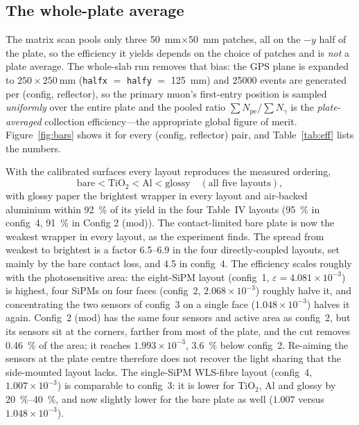 \documentclass[11pt,a4paper]{article}
\newcommand{\pe}{\ensuremath{N_{\mathrm{pe}}}}
\newcommand{\ngam}{\ensuremath{N_{\gamma}}}
\newcommand{\eff}{\ensuremath{\varepsilon}}
\begin{document}
\subsection{The whole-plate average}

The matrix scan pools only three \SI{50}{\milli\meter}$\times$\SI{50}{\milli\meter}
patches, all on the $-y$ half of the plate, so the efficiency it yields depends
on the choice of patches and is \emph{not} a plate average. The whole-slab run
removes that bias: the GPS plane is expanded to
$250 \times \SI{250}{\milli\meter}$ (\texttt{halfx} $=$ \texttt{halfy} $=$
\SI{125}{\milli\meter}) and \num{25000} events are generated per
(config, reflector), so the primary muon's first-entry position is sampled
\emph{uniformly} over the entire plate and the pooled ratio
$\sum\pe/\sum\ngam$ is the \emph{plate-averaged} collection efficiency---the
appropriate global figure of merit. Figure~\ref{fig:bars} shows it for every
(config, reflector) pair, and Table~\ref{tab:eff} lists the numbers.

With the calibrated surfaces every layout reproduces the measured ordering,
\[
  \text{bare} < \text{TiO}_2 < \text{Al} < \text{glossy}
  \quad(\text{all five layouts}),
\]
with glossy paper the brightest wrapper in every layout and air-backed
aluminium within \SI{92}{\percent} of its yield in the four Table~IV layouts
(\SI{95}{\percent} in config~4, \SI{91}{\percent} in Config 2 (mod)). The
contact-limited bare plate is now the weakest wrapper in every layout, as the
experiment finds. The spread from weakest to brightest is a factor
\num{6.5}--\num{6.9} in the four directly-coupled layouts, set mainly by the
bare contact loss, and \num{4.5} in config~4.
The efficiency scales roughly with the photosensitive area: the eight-SiPM
layout (config~1, $\eff = 4.081\times10^{-3}$) is highest, four SiPMs on
four faces (config~2, $2.068\times10^{-3}$) roughly halve it, and concentrating
the two sensors of config~3 on a single face ($1.048\times10^{-3}$) halves it
again. Config~2 (mod) has the same four sensors and active area as config~2,
but its sensors sit at the corners, farther from most of the plate, and the
cut removes \SI{0.46}{\percent} of the area; it reaches
$1.993\times10^{-3}$, \SI{3.6}{\percent} below config~2. Re-aiming the
sensors at the plate centre therefore does not recover the light sharing that
the side-mounted layout lacks. The single-SiPM WLS-fibre layout (config~4,
$1.007\times10^{-3}$) is comparable to config~3:
it is lower for TiO$_2$, Al and glossy by \SI{20}{\percent}--\SI{40}{\percent},
and now slightly lower for the bare plate as well ($1.007$ versus
$1.048\times10^{-3}$).
\end{document}
